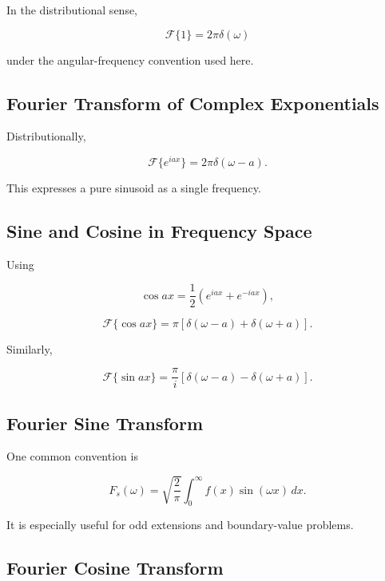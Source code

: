 In the distributional sense,

\[
\boxed{
\mathcal{F}\{1\}
=
2\pi\delta(\omega)
}
\]

under the angular-frequency convention used here.

\subsection{Fourier Transform of Complex Exponentials}
\label{subsec:fourier-complex-exponential}

Distributionally,

\[
\boxed{
\mathcal{F}
\{
e^{iax}
\}
=
2\pi
\delta(\omega-a).
}
\]

This expresses a pure sinusoid as a single frequency.

\subsection{Sine and Cosine in Frequency Space}
\label{subsec:fourier-sine-cosine-delta}

Using

\[
\cos ax
=
\frac12
(e^{iax}+e^{-iax}),
\]

\[
\boxed{
\mathcal{F}\{\cos ax\}
=
\pi
[
\delta(\omega-a)
+
\delta(\omega+a)
].
}
\]

Similarly,

\[
\boxed{
\mathcal{F}\{\sin ax\}
=
\frac{\pi}{i}
[
\delta(\omega-a)
-
\delta(\omega+a)
].
}
\]

\subsection{Fourier Sine Transform}
\label{subsec:fourier-sine-transform-reference}

One common convention is

\[
\boxed{
F_s(\omega)
=
\sqrt{
\frac{2}{\pi}
}
\int_0^\infty
f(x)\sin(\omega x)
\,dx.
}
\]

It is especially useful for odd extensions and boundary-value problems.

\subsection{Fourier Cosine Transform}
\label{subsec:fourier-cosine-transform-reference}

